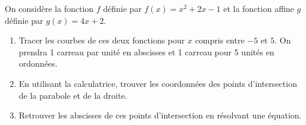 \begin{exo}
On considère la fonction $f$ définie par  $f(x)=x^2+2x-1$ et la fonction affine $g$ définie par $g(x)=4x+2$.


%
%
%



\begin{enumerate}
\item Tracer les courbes de ces deux fonctions pour $x$ compris entre $-5$ et $5$. On prendra 1 carreau par unité en abscisses et 1 carreau pour 5 unités en ordonnées.

\item En utilisant la calculatrice, trouver les coordonnées des points d'intersection de la parabole et de la droite.

\item Retrouver les abscisses de ces points d'intersection en résolvant une équation.

 
\end{enumerate}
\end{exo}





